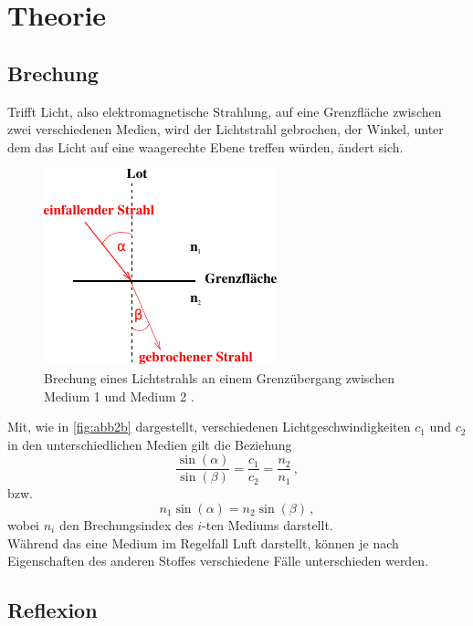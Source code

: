 \section{Theorie}
\label{sec:theorie}

\subsection*{Brechung}

Trifft Licht, also elektromagnetische Strahlung, auf eine Grenzfläche zwischen zwei verschiedenen Medien, wird der Lichtstrahl gebrochen, 
der Winkel, unter dem das Licht auf eine waagerechte Ebene treffen würden, ändert sich.

\begin{figure}[H]
    \centering
    \includegraphics{figures/Abb_2b.pdf}
    \caption{Brechung eines Lichtstrahls an einem Grenzübergang zwischen Medium 1 und Medium 2 \cite{ap02}.}
    \label{fig:abb2b}
\end{figure}

Mit, wie in \autoref{fig:abb2b} dargestellt, verschiedenen Lichtgeschwindigkeiten $c_1$ und $c_2$ in den unterschiedlichen Medien gilt die Beziehung
\begin{equation}
    \frac{\sin(\alpha)}{\sin(\beta)} = \frac{c_1}{c_2} = \frac{n_2}{n_1} \,,
    \label{eq:brechungsgesetz}
\end{equation}
bzw.
\begin{equation}
    n_1 \sin(\alpha) = n_2 \sin(\beta) \,,
    \label{eq:snellius}
\end{equation}
wobei $n_i$ den Brechungsindex des $i$-ten Mediums darstellt. \\

Während das eine Medium im Regelfall Luft darstellt, können je nach Eigenschaften des anderen Stoffes verschiedene Fälle unterschieden werden. \\

\subsection*{Reflexion}

